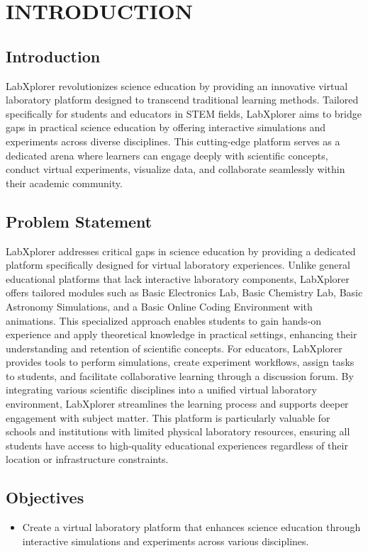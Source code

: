 \chapter{INTRODUCTION}



\section{Introduction}
LabXplorer revolutionizes science education by providing an innovative virtual laboratory platform designed to transcend traditional learning methods. Tailored specifically for students and educators in STEM fields, LabXplorer aims to bridge gaps in practical science education by offering interactive simulations and experiments across diverse disciplines. This cutting-edge platform serves as a dedicated arena where learners can engage deeply with scientific concepts, conduct virtual experiments, visualize data, and collaborate seamlessly within their academic community.


\section{Problem Statement}
LabXplorer addresses critical gaps in science education by providing a dedicated platform specifically designed for virtual laboratory experiences. Unlike general educational platforms that lack interactive laboratory components, LabXplorer offers tailored modules such as Basic Electronics Lab, Basic Chemistry Lab, Basic Astronomy Simulations, and a Basic Online Coding Environment with animations. This specialized approach enables students to gain hands-on experience and apply theoretical knowledge in practical settings, enhancing their understanding and retention of scientific concepts. For educators, LabXplorer provides tools to perform simulations, create experiment workflows, assign tasks to students, and facilitate collaborative learning through a discussion forum. By integrating various scientific disciplines into a unified virtual laboratory environment, LabXplorer streamlines the learning process and supports deeper engagement with subject matter. This platform is particularly valuable for schools and institutions with limited physical laboratory resources, ensuring all students have access to high-quality educational experiences regardless of their location or infrastructure constraints.
\section{Objectives}
\begin{itemize}
    \item Create a virtual laboratory platform that enhances science education through interactive simulations and experiments across various disciplines.
\end{itemize}
